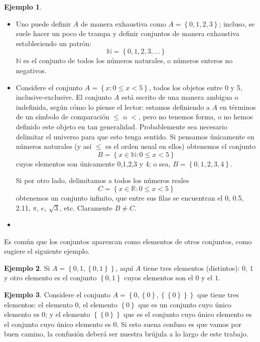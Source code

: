 \documentclass{book}
\newcommand{\set}[1]{\left\lbrace #1 \right\rbrace }
\theoremstyle{definition}
\newtheorem{ejm}{Ejemplo}[chapter]
\begin{document}
\begin{ejm}	\begin{itemize}
	\item Uno puede definir $A$ de manera exhaustiva como $A=\set{0,1,2,3}$; incluso, se suele hacer un poco de trampa y definir conjuntos de manera exhaustiva estableciendo un patrón:
	\[\mathbb{N} = \set{0,1,2,3,\ldots}\]
	$\mathbb{N}$ es el conjunto de todos los números naturales, o números enteros no negativos.
	
	\item Considere el conjunto $A=\set{x : 0\leq x < 5}$, todos los objetos entre 0 y 5, inclusive-exclusive. El conjunto $A$ está escrito de una manera ambigua o indefinida, según cómo lo piense el lector: estamos definiendo a $A$ en términos de un símbolo de comparación $\leq$ o $<$, pero no tenemos forma, o no hemos definido este objeto en tan generalidad. Probablemente sea necesario delimitar el universo para que esto tenga sentido. 
	Si pensamos únicamente en números naturales (y así $\leq$ es el orden usual en ellos) obtenemos el conjunto
	\[B = \set{x \in \mathbb{N}: 0\leq x < 5}\]
	cuyos elementos son únicamente 0,1,2,3 y 4; o sea, $B = \set{0,1,2,3,4}$.
	
	Si por otro lado, delimitamos a todos los números reales
	\[C = \set{x \in \mathbb{R}: 0\leq x < 5}\]
	obtenemos un conjunto infinito, que entre sus filas se encuentran el 0, 0.5, 2.11, $\pi$, $e$, $\sqrt{3}$, etc.
	Claramente $B \neq C$.
	
	\item %
\end{itemize}\end{ejm}

Es común que los conjuntos aparezcan como elementos de otros conjuntos, como sugiere el siguiente ejemplo.
\begin{ejm}
	Si $A = \set{0,1, \set{0,1}}$, aquí $A$ tiene tres elementos (distintos): $0$, $1$ y otro elemento es el conjunto $\set{0,1}$ cuyos elementos son el $0$ y el $1$.
\end{ejm}

\begin{ejm}
	Considere el conjunto $A= \set{0,\set{0}, \set{\set{0}}}$ que tiene tres elementos: el elemento $0$, el elemento $\set{0}$ que es un conjunto cuyo único elemento es $0$; y el elemento $\set{\set{0}}$ que es el conjunto cuyo único elemento es el conjunto cuyo único elemento es $0$.
	Si esto suena confuso es que vamos por buen camino, la confusión deberá ser nuestra brújula a lo largo de este trabajo.
\end{ejm}
\end{document}
